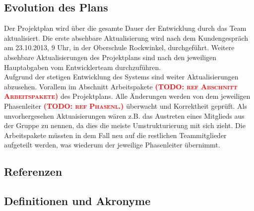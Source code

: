 \documentclass[fontsize=12pt,paper=a4,twoside]{scrartcl}
\newcommand{\todo}[1]{\textbf{\textsc{\textcolor{red}{(TODO: #1)}}}}
\begin{document}
\subsection{Evolution des Plans}

Der Projektplan wird über die gesamte Dauer der Entwicklung durch das Team aktualisiert. Die erste absehbare Aktualisierung wird nach dem Kundengespräch am 23.10.2013, 9 Uhr, in der Oberschule Rockwinkel, durchgeführt. Weitere absehbare Aktualisierungen des Projektplans sind nach den jeweiligen Hauptabgaben vom Entwicklerteam durchzuführen. \\
Aufgrund der stetigen Entwicklung des Systems sind weiter Aktualisierungen abzusehen. Vorallem im Abschnitt Arbeitspakete \todo{ref Abschnitt Arbeitspakete} des Projektplans. Alle Änderungen werden von dem jeweiligen Phasenleiter \todo{ref Phasenl.} überwacht und Korrektheit geprüft. Als unvorhergesehen Aktuaisierungen wären z.B. das Austreten eines Mitglieds aus der Gruppe zu nennen, da dies die meiste Umstrukturierung mit sich zieht. Die Arbeitspakete müssten in dem Fall neu auf die restlichen Teammitglieder aufgeteilt werden, was wiederum der jeweilige Phasenleiter übernimmt.

\subsection{Referenzen}
%
%
%
%

{\renewcommand\section[2]{}

}

\newpage

\subsection{Definitionen und Akronyme\\}
\end{document}
